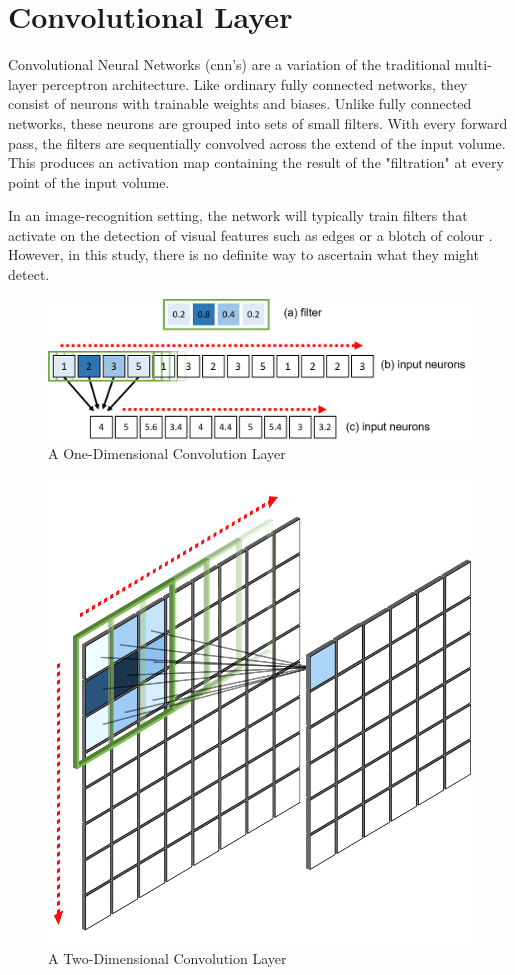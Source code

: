 \documentclass[11pt,oneside,openany,a4paper,english, report, goldenblock
]{usthesis}
\begin{document}
\section{Convolutional Layer}

Convolutional Neural Networks (\acrshort{cnn}'s) are a variation of the traditional multi-layer perceptron architecture. Like ordinary fully connected networks, they consist of neurons with trainable weights and biases. Unlike fully connected networks, these neurons are grouped into sets of small filters. With every forward pass, the filters are sequentially convolved across the extend of the input volume. This produces an activation map containing the result of the "filtration" at every point of the input volume.

In an image-recognition setting, the network will typically train filters that activate on the detection of visual features such as edges or a blotch of colour \citep{cs231n}. However, in this study, there is no definite way to ascertain what they might detect.

\begin{figure}[h]
	\centering
	\includegraphics[width=0.9\linewidth]{Images/Diagrams/1D_Convolution}
	\caption[1D Convolutional Layer]{A One-Dimensional Convolution Layer}
	\label{fig:1dconvolution}
\end{figure}

\begin{figure}[h]
	\centering
	\includegraphics[width=0.4\linewidth]{Images/Diagrams/2D_Convolution}
	\caption[2D Convolution Layer]{A Two-Dimensional Convolution Layer}
	\label{fig:2dconvolution}
\end{figure}
\end{document}
